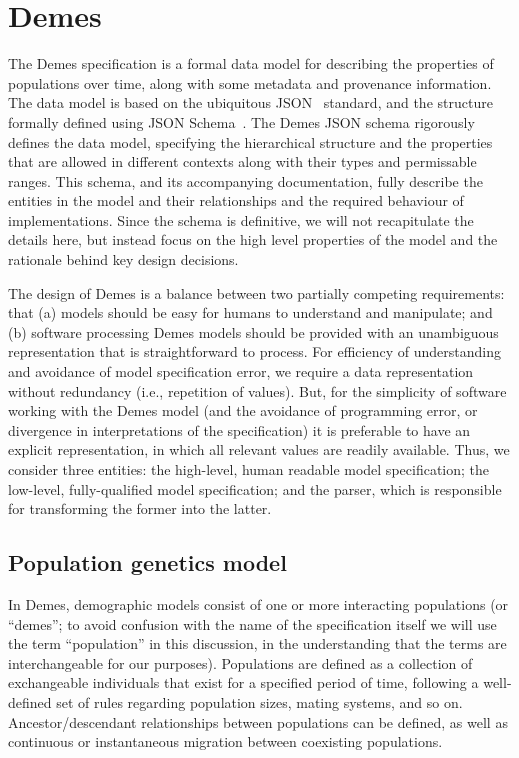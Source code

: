 \documentclass[11pt]{article}
\begin{document}
\section*{Demes}

The Demes specification is a formal data model for describing
the properties of populations over time,
along with some metadata and provenance information.
The data model is based on the ubiquitous JSON~\citep{bray2017javascript}
standard, and the structure formally defined using
JSON Schema~\citep{wright2020json}.
The Demes JSON schema rigorously defines the data model,
specifying the hierarchical structure and the properties that are allowed in different
contexts along with their types and permissable ranges. This schema, and its
accompanying documentation, fully describe the entities in the model and their
relationships and the required behaviour of implementations. Since the
schema is definitive, we will not recapitulate the details
here, but instead focus on the high level properties of the model and
the rationale behind key design decisions.

The design of Demes is a balance between two partially competing requirements:
that (a) models should be easy for humans to understand and manipulate; and (b)
software processing Demes models should be provided with an unambiguous
representation that is straightforward to process. For efficiency of
understanding and avoidance of model specification error, we require a data
representation without redundancy (i.e., repetition of values). But, for the
simplicity of software working with the Demes model (and the avoidance of
programming error, or divergence in interpretations of the specification) it is
preferable to have an explicit representation, in which all relevant values are
readily available. Thus, we consider three entities: the high-level, human
readable model specification; the low-level, fully-qualified model
specification; and the parser, which is responsible for transforming the former
into the latter.

\subsection*{Population genetics model}

In Demes, demographic models consist of one or more interacting populations (or
``demes''; to avoid confusion with the name of the specification itself we will
use the term ``population'' in this discussion, in the understanding that the
terms are interchangeable for our purposes). Populations are defined as a
collection of exchangeable individuals that exist for a specified period of
time, following a well-defined set of rules regarding population sizes, mating
systems, and so on. Ancestor/descendant relationships between populations can
be defined, as well as continuous or instantaneous migration between coexisting
populations.
\end{document}
